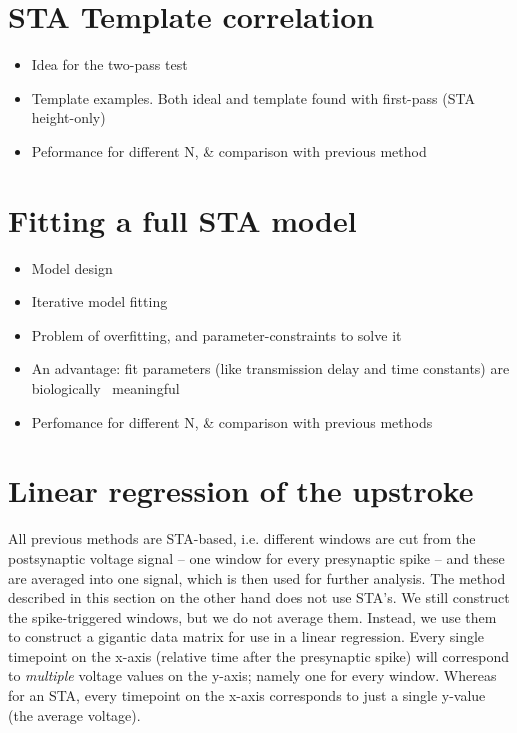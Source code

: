 


\section{STA Template correlation}

\begin{itemize}
    \item Idea for the two-pass test
    \item Template examples. Both ideal and template found with first-pass (STA height-only)
    \item Peformance for different N, \& comparison with previous method
\end{itemize}



\section{Fitting a full STA model}

\begin{itemize}
    \item Model design
    \item Iterative model fitting
    \item Problem of overfitting, and parameter-constraints to solve it
    \item An advantage: fit parameters (like transmission delay and time constants) are biologically ~meaningful
    \item Perfomance for different N, \& comparison with previous methods
\end{itemize}


\section{Linear regression of the upstroke}

All previous methods are STA-based, i.e. different windows are cut from the postsynaptic voltage signal -- one window for every presynaptic spike -- and these are averaged into one signal, which is then used for further analysis. The method described in this section on the other hand does not use STA's. We still construct the spike-triggered windows, but we do not average them. Instead, we use them to construct a gigantic data matrix for use in a linear regression.
Every single timepoint on the x-axis (relative time after the presynaptic spike) will correspond to \emph{multiple} voltage values on the y-axis; namely one for every window. Whereas for an STA, every timepoint on the x-axis corresponds to just a single y-value (the average voltage).


